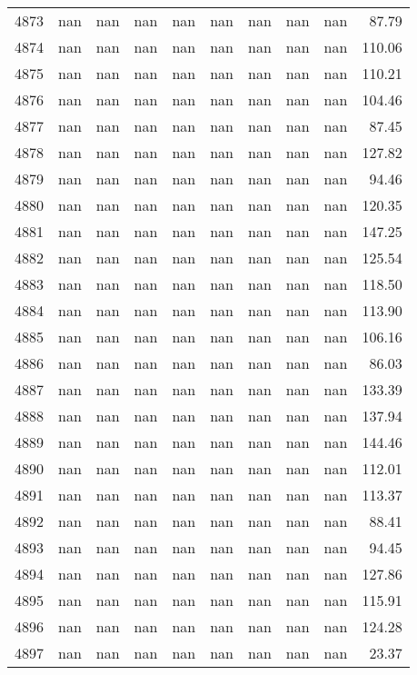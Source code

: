 \begin{tabular}{lrrrrrrrrr}
4873 & nan & nan & nan & nan & nan & nan & nan & nan & 87.79 \\
4874 & nan & nan & nan & nan & nan & nan & nan & nan & 110.06 \\
4875 & nan & nan & nan & nan & nan & nan & nan & nan & 110.21 \\
4876 & nan & nan & nan & nan & nan & nan & nan & nan & 104.46 \\
4877 & nan & nan & nan & nan & nan & nan & nan & nan & 87.45 \\
4878 & nan & nan & nan & nan & nan & nan & nan & nan & 127.82 \\
4879 & nan & nan & nan & nan & nan & nan & nan & nan & 94.46 \\
4880 & nan & nan & nan & nan & nan & nan & nan & nan & 120.35 \\
4881 & nan & nan & nan & nan & nan & nan & nan & nan & 147.25 \\
4882 & nan & nan & nan & nan & nan & nan & nan & nan & 125.54 \\
4883 & nan & nan & nan & nan & nan & nan & nan & nan & 118.50 \\
4884 & nan & nan & nan & nan & nan & nan & nan & nan & 113.90 \\
4885 & nan & nan & nan & nan & nan & nan & nan & nan & 106.16 \\
4886 & nan & nan & nan & nan & nan & nan & nan & nan & 86.03 \\
4887 & nan & nan & nan & nan & nan & nan & nan & nan & 133.39 \\
4888 & nan & nan & nan & nan & nan & nan & nan & nan & 137.94 \\
4889 & nan & nan & nan & nan & nan & nan & nan & nan & 144.46 \\
4890 & nan & nan & nan & nan & nan & nan & nan & nan & 112.01 \\
4891 & nan & nan & nan & nan & nan & nan & nan & nan & 113.37 \\
4892 & nan & nan & nan & nan & nan & nan & nan & nan & 88.41 \\
4893 & nan & nan & nan & nan & nan & nan & nan & nan & 94.45 \\
4894 & nan & nan & nan & nan & nan & nan & nan & nan & 127.86 \\
4895 & nan & nan & nan & nan & nan & nan & nan & nan & 115.91 \\
4896 & nan & nan & nan & nan & nan & nan & nan & nan & 124.28 \\
4897 & nan & nan & nan & nan & nan & nan & nan & nan & 23.37 \\

\end{tabular}
